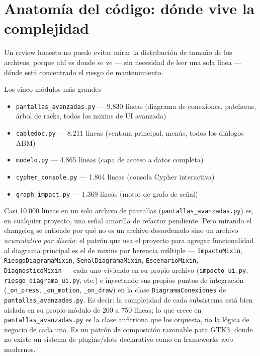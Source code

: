 \documentclass[11pt,twocolumn]{article}
\begin{document}
\section{Anatomía del código: dónde vive la complejidad}

Un review honesto no puede evitar mirar la distribución de tamaño de los archivos, porque ahí es donde se ve --- sin necesidad de leer una sola línea --- dónde está concentrado el riesgo de mantenimiento.

\begin{specbox}{Los cinco módulos más grandes}
\begin{itemize}[leftmargin=1.1em,itemsep=1pt,topsep=2pt]
\item \texttt{pantallas\_avanzadas.py} --- 9.830 líneas (diagrama de conexiones, patcheras, árbol de racks, todos los mixins de UI avanzada)
\item \texttt{cabledoc.py} --- 8.211 líneas (ventana principal, menús, todos los diálogos ABM)
\item \texttt{modelo.py} --- 4.865 líneas (capa de acceso a datos completa)
\item \texttt{cypher\_console.py} --- 1.864 líneas (consola Cypher interactiva)
\item \texttt{graph\_impact.py} --- 1.369 líneas (motor de grafo de señal)
\end{itemize}
\end{specbox}

Casi 10.000 líneas en un solo archivo de pantallas (\texttt{pantallas\_avanzadas.py}) es, en cualquier proyecto, una señal amarilla de refactor pendiente. Pero mirando el changelog se entiende por qué no es un archivo desordenado sino un archivo \emph{acumulativo por diseño}: el patrón que usa el proyecto para agregar funcionalidad al diagrama principal es el de mixins por herencia múltiple --- \texttt{ImpactoMixin}, \texttt{RiesgoDiagramaMixin}, \texttt{SenalDiagramaMixin}, \texttt{EscenarioMixin}, \texttt{DiagnosticoMixin} --- cada uno viviendo en su propio archivo (\texttt{impacto\_ui.py}, \texttt{riesgo\_diagrama\_ui.py}, etc.) e inyectando sus propios puntos de integración (\texttt{\_on\_press}, \texttt{\_on\_motion}, \texttt{\_on\_draw}) en la clase \texttt{DiagramaConexiones} de \texttt{pantallas\_avanzadas.py}. Es decir: la complejidad de cada subsistema está bien aislada en su propio módulo de 200 a 750 líneas; lo que crece en \texttt{pantallas\_avanzadas.py} es la clase anfitriona que los orquesta, no la lógica de negocio de cada uno. Es un patrón de composición razonable para GTK3, donde no existe un sistema de plugins/slots declarativo como en frameworks web modernos.
\end{document}
